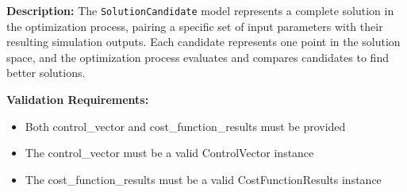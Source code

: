 \textbf{Description:}
The \texttt{SolutionCandidate} model represents a complete solution in the optimization process, pairing a specific set of input parameters with their resulting simulation outputs. Each candidate represents one point in the solution space, and the optimization process evaluates and compares candidates to find better solutions.

\textbf{Validation Requirements:}
\begin{itemize}
	\item Both control\_vector and cost\_function\_results must be provided
	\item The control\_vector must be a valid ControlVector instance
	\item The cost\_function\_results must be a valid CostFunctionResults instance
\end{itemize}

